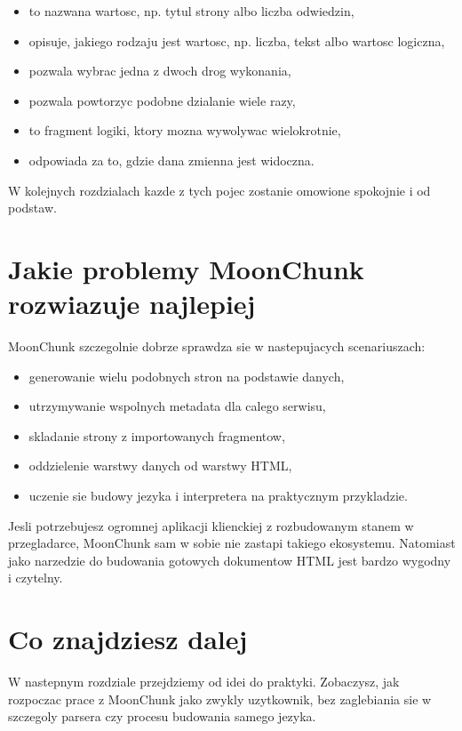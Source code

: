 \begin{itemize}
  \item {} to nazwana wartosc, np. tytul strony albo liczba odwiedzin,
  \item {} opisuje, jakiego rodzaju jest wartosc, np. liczba, tekst albo wartosc logiczna,
  \item {} pozwala wybrac jedna z dwoch drog wykonania,
  \item {} pozwala powtorzyc podobne dzialanie wiele razy,
  \item {} to fragment logiki, ktory mozna wywolywac wielokrotnie,
  \item {} odpowiada za to, gdzie dana zmienna jest widoczna.
\end{itemize}

W kolejnych rozdzialach kazde z tych pojec zostanie omowione spokojnie i od podstaw.

\section{Jakie problemy MoonChunk rozwiazuje najlepiej}
MoonChunk szczegolnie dobrze sprawdza sie w nastepujacych scenariuszach:

\begin{itemize}
  \item generowanie wielu podobnych stron na podstawie danych,
  \item utrzymywanie wspolnych metadata dla calego serwisu,
  \item skladanie strony z importowanych fragmentow,
  \item oddzielenie warstwy danych od warstwy HTML,
  \item uczenie sie budowy jezyka i interpretera na praktycznym przykladzie.
\end{itemize}

Jesli potrzebujesz ogromnej aplikacji klienckiej z rozbudowanym stanem w przegladarce,
MoonChunk sam w sobie nie zastapi takiego ekosystemu. Natomiast jako narzedzie do
budowania gotowych dokumentow HTML jest bardzo wygodny i czytelny.

\section{Co znajdziesz dalej}
W nastepnym rozdziale przejdziemy od idei do praktyki. Zobaczysz, jak rozpoczac
prace z MoonChunk jako zwykly uzytkownik, bez zaglebiania sie w szczegoly parsera
czy procesu budowania samego jezyka.
